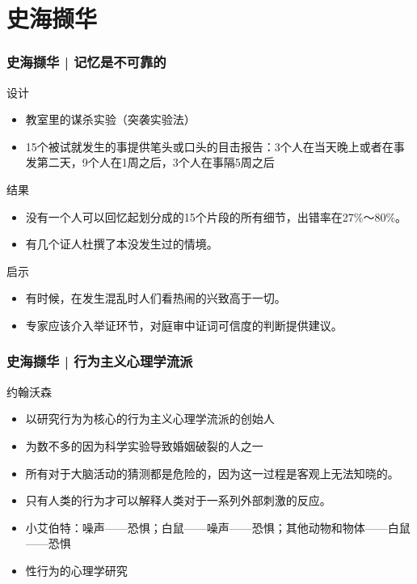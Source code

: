 \section{史海撷华}
\begin{frame}
  \frametitle{史海撷华 | 记忆是不可靠的}
  \begin{block}{设计}
    \begin{itemize}
      \item 教室里的谋杀实验（突袭实验法）
      \item 15个被试就发生的事提供笔头或口头的目击报告：3个人在当天晚上或者在事发第二天，9个人在1周之后，3个人在事隔5周之后
    \end{itemize}
  \end{block}
  \pause
  \begin{block}{结果}
    \begin{itemize}
      \item 没有一个人可以回忆起划分成的15个片段的所有细节，出错率在27\%～80\%。
      \item 有几个证人杜撰了本没发生过的情境。
    \end{itemize}
  \end{block}
  \pause
  \begin{block}{启示}
    \begin{itemize}
      \item 有时候，在发生混乱时人们看热闹的兴致高于一切。
      \item 专家应该介入举证环节，对庭审中证词可信度的判断提供建议。
    \end{itemize}
  \end{block}
\end{frame}

\begin{frame}
  \frametitle{史海撷华 | 行为主义心理学流派}
  \begin{block}{约翰\textbullet 沃森}
    \begin{itemize}
      \item 以研究行为为核心的行为主义心理学流派的创始人
      \item 为数不多的因为科学实验导致婚姻破裂的人之一
      \item 所有对于大脑活动的猜测都是危险的，因为这一过程是客观上无法知晓的。
      \item 只有人类的行为才可以解释人类对于一系列外部刺激的反应。
      \item 小艾伯特：噪声——恐惧；白鼠——噪声——恐惧；其他动物和物体——白鼠——恐惧
      \item 性行为的心理学研究
    \end{itemize}
  \end{block}
\end{frame}

